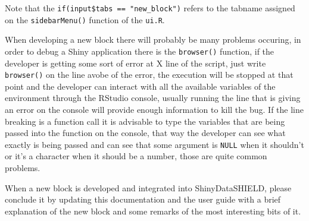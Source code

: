 \documentclass[
]{book}
\begin{document}
Note that the \texttt{if(input\$tabs\ ==\ "new\_block")} refers to the tabname assigned on the \texttt{sidebarMenu()} function of the \texttt{ui.R}.

When developing a new block there will probably be many problems occuring, in order to debug a Shiny application there is the \texttt{browser()} function, if the developer is getting some sort of error at X line of the script, just write \texttt{browser()} on the line avobe of the error, the execution will be stopped at that point and the developer can interact with all the available variables of the environment through the RStudio console, usually running the line that is giving an error on the console will provide enough information to kill the bug. If the line breaking is a function call it is advisable to type the variables that are being passed into the function on the console, that way the developer can see what exactly is being passed and can see that some argument is \texttt{NULL} when it shouldn't or it's a character when it should be a number, those are quite common problems.

When a new block is developed and integrated into ShinyDataSHIELD, please conclude it by updating this documentation and the user guide with a brief explanation of the new block and some remarks of the most interesting bits of it.

  
\end{document}
